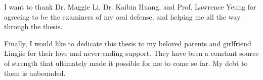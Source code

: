 I want to thank Dr. Maggie Li, Dr. Kaibin Huang, and Prof. Lawrence Yeung 
for agreeing to be the examiners of my oral defense, and  helping me all the way through the thesis. %

Finally, I would like to dedicate this thesis to my beloved parents and girlfriend Lingjie for their love and never-ending support.
They have been a constant source of strength that ultimately made it possible for me to come so far. 
My debt to them is unbounded.
\cleardoublepage %
